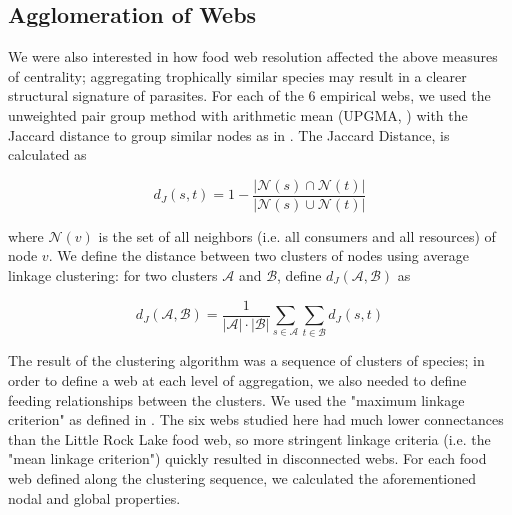 \documentclass[../dissertation.tex]{subfiles}
\begin{document}
\subsection{Agglomeration of Webs} We were also interested in how food web
resolution affected the above measures of centrality; aggregating trophically
similar species may result in a clearer structural signature of parasites. For
each of the 6 empirical webs, we used the unweighted pair group method with
arithmetic mean (UPGMA, \cite{Sokal1958}) with the Jaccard distance to group
similar nodes as in \cite{Martinez1991}. The Jaccard Distance,
\cite{Jaccard1908} is calculated as 

\begin{equation} 
    d_J(s,t) = 1-\frac{|\mathcal{N}(s)\cap \mathcal{N}(t)|}{|\mathcal{N}(s)\cup \mathcal{N}(t)|}
\label{eq:JaccardDistance} 
\end{equation} 

where $\mathcal{N}(v)$ is the set of all neighbors (i.e. all consumers and all
resources) of node $v$. We define the distance between two clusters of nodes using
average linkage clustering: for two clusters $\mathcal{A}$ and $\mathcal{B}$,
define $d_J(\mathcal{A},\mathcal{B})$ as

\begin{equation} 
    d_J(\mathcal{A},\mathcal{B}) = \frac{1}{|\mathcal{A}|\cdot|\mathcal{B}|}\sum_{s\in\mathcal{A}}\sum_{t\in\mathcal{B}}d_J(s,t)
\label{eq:averageLinkage} 
\end{equation}

The result of the clustering algorithm was a sequence of clusters of species;
in order to define a web at each level of aggregation, we also needed to define
feeding relationships between the clusters. We used the "maximum linkage
criterion" as defined in \cite{Martinez1991}. The six webs studied here had
much lower connectances than the Little Rock Lake food web, so more stringent
linkage criteria (i.e. the "mean linkage criterion") quickly resulted in
disconnected webs. For each food web defined along the clustering sequence, we calculated the
aforementioned nodal and global properties. 
\end{document}
